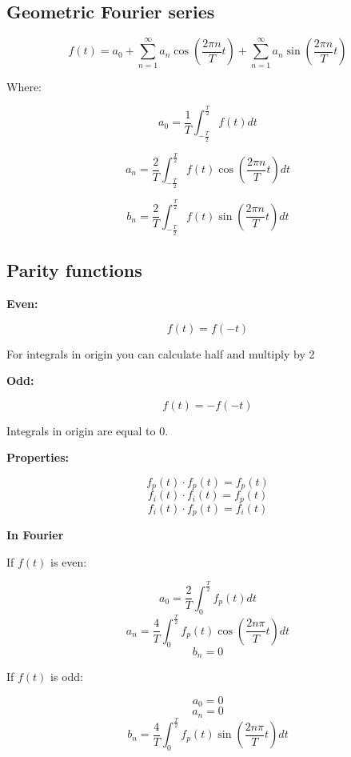\documentclass[letterpaper]{article}
\newcommand{\divline}{\noindent\makebox[\linewidth]{\rule{\textwidth}{0.4pt}}}
\begin{document}
        \begin{multicols}{2}

            \section{Geometric Fourier series}

                \[f(t) = a_{0} + \sum_{n = 1}^{\infty} a_{n} \cos{( \frac{2 \pi n}{T} t )} + \sum_{n = 1}^{\infty} a_{n} \sin{( \frac{2 \pi n}{T} t )} \]

                Where:

                \[a_{0} = \frac{1}{T} \int_{-\frac{T}{2}}^{\frac{T}{2}} f(t) dt \]

                \[a_{n} = \frac{2}{T} \int_{-\frac{T}{2}}^{\frac{T}{2}} f(t) \cos{( \frac{2 \pi n}{T} t )} dt \]

                \[b_{n} = \frac{2}{T} \int_{-\frac{T}{2}}^{\frac{T}{2}} f(t) \sin{( \frac{2 \pi n}{T} t )} dt \]

        \end{multicols}

        \divline

        \begin{multicols}{3}
            \section{Parity functions}
                
                \textbf{Even:}

                \[f(t) = f(-t)\]

                For integrals in origin you can calculate half and multiply by 2

                \textbf{Odd:}

                \[f(t) = - f(-t)\]

                Integrals in origin are equal to 0.

                \textbf{Properties:}

                \[f_{p}(t) \cdot f_{p}(t) = f_{p}(t)\]
                \[f_{i}(t) \cdot f_{i}(t) = f_{p}(t)\]
                \[f_{i}(t) \cdot f_{p}(t) = f_{i}(t)\]

                \textbf{In Fourier}

                If \(f(t)\) is even:

                \[a_{0} = \frac{2}{T} \int_{0}^{\frac{T}{2}} f_{p}(t) dt \]
                \[a_{n} = \frac{4}{T} \int_{0}^{\frac{T}{2}} f_{p}(t) \cos{(\frac{2 n \pi}{T} t)} dt \]
                \[b_{n} = 0\]

                If \(f(t)\) is odd:

                \[a_{0} = 0\]
                \[a_{n} = 0\]
                \[b_{n} = \frac{4}{T} \int_{0}^{\frac{T}{2}} f_{p}(t) \sin{(\frac{2 n \pi}{T} t)} dt \]
                
        \end{multicols}
\end{document}
